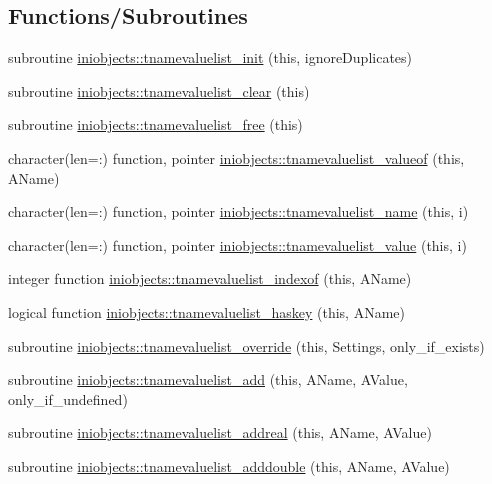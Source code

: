 \subsection*{Functions/\+Subroutines}
\begin{DoxyCompactItemize}
\item 
subroutine \mbox{\hyperlink{namespaceiniobjects_aaa5d8364fae58e251714849bb64e5124}{iniobjects\+::tnamevaluelist\+\_\+init}} (this, ignore\+Duplicates)
\item 
subroutine \mbox{\hyperlink{namespaceiniobjects_a5f3c26a113f5171e6bdf68705ced9854}{iniobjects\+::tnamevaluelist\+\_\+clear}} (this)
\item 
subroutine \mbox{\hyperlink{namespaceiniobjects_aaa465cf37dfe148879b8073a289ab2f8}{iniobjects\+::tnamevaluelist\+\_\+free}} (this)
\item 
character(len=\+:) function, pointer \mbox{\hyperlink{namespaceiniobjects_a885480cca0257f187dfcd491a588ce52}{iniobjects\+::tnamevaluelist\+\_\+valueof}} (this, A\+Name)
\item 
character(len=\+:) function, pointer \mbox{\hyperlink{namespaceiniobjects_a4f92f7df639bb521266ea3f6be8dbc47}{iniobjects\+::tnamevaluelist\+\_\+name}} (this, i)
\item 
character(len=\+:) function, pointer \mbox{\hyperlink{namespaceiniobjects_a61f8d01755e0bc000c0c8ca3eba8e43a}{iniobjects\+::tnamevaluelist\+\_\+value}} (this, i)
\item 
integer function \mbox{\hyperlink{namespaceiniobjects_af6bb8b086a07d911f23b9d408dd89a2e}{iniobjects\+::tnamevaluelist\+\_\+indexof}} (this, A\+Name)
\item 
logical function \mbox{\hyperlink{namespaceiniobjects_ae95e15db4e04c8026f9193252ebe48e6}{iniobjects\+::tnamevaluelist\+\_\+haskey}} (this, A\+Name)
\item 
subroutine \mbox{\hyperlink{namespaceiniobjects_a96ec4d817cb41567afeefde7d8c0c7ec}{iniobjects\+::tnamevaluelist\+\_\+override}} (this, Settings, only\+\_\+if\+\_\+exists)
\item 
subroutine \mbox{\hyperlink{namespaceiniobjects_a0bf091b688bae891c20047d3b5bfca2a}{iniobjects\+::tnamevaluelist\+\_\+add}} (this, A\+Name, A\+Value, only\+\_\+if\+\_\+undefined)
\item 
subroutine \mbox{\hyperlink{namespaceiniobjects_a4ede9664ab0d5e4d00d1983e70c64322}{iniobjects\+::tnamevaluelist\+\_\+addreal}} (this, A\+Name, A\+Value)
\item 
subroutine \mbox{\hyperlink{namespaceiniobjects_a8214934f23a7801b7ec3c3f6da452aac}{iniobjects\+::tnamevaluelist\+\_\+adddouble}} (this, A\+Name, A\+Value)

\end{DoxyCompactItemize}
